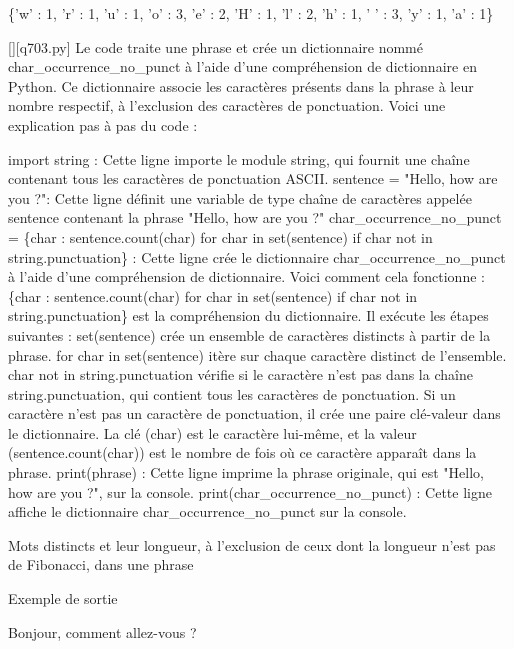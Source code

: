 \{'w' : 1, 'r' : 1, 'u' : 1, 'o' : 3, 'e' : 2, 'H' : 1, 'l' : 2, 'h' : 1, ' ' : 3, 'y' : 1, 'a' : 1\}
        \par
        \begin{solution}
            \renewcommand{\nomfichier}{q703.py}
            \pythonfile{\chemincode \nomfichier}[][\nomfichier]
            Le code traite une phrase et crée un dictionnaire nommé char\_occurrence\_no\_punct à l'aide d'une compréhension de dictionnaire en Python. Ce dictionnaire associe les caractères présents dans la phrase à leur nombre respectif, à l'exclusion des caractères de ponctuation. Voici une explication pas à pas du code :

    import string : Cette ligne importe le module string, qui fournit une chaîne contenant tous les caractères de ponctuation ASCII.
    sentence = "Hello, how are you ?": Cette ligne définit une variable de type chaîne de caractères appelée sentence contenant la phrase "Hello, how are you ?"
    char\_occurrence\_no\_punct = \{char : sentence.count(char) for char in set(sentence) if char not in string.punctuation\} : Cette ligne crée le dictionnaire char\_occurrence\_no\_punct à l'aide d'une compréhension de dictionnaire. Voici comment cela fonctionne :
        \{char : sentence.count(char) for char in set(sentence) if char not in string.punctuation\} est la compréhension du dictionnaire. Il exécute les étapes suivantes :
        set(sentence) crée un ensemble de caractères distincts à partir de la phrase.
        for char in set(sentence) itère sur chaque caractère distinct de l'ensemble.
        char not in string.punctuation vérifie si le caractère n'est pas dans la chaîne string.punctuation, qui contient tous les caractères de ponctuation.
        Si un caractère n'est pas un caractère de ponctuation, il crée une paire clé-valeur dans le dictionnaire. La clé (char) est le caractère lui-même, et la valeur (sentence.count(char)) est le nombre de fois où ce caractère apparaît dans la phrase.
    print(phrase) : Cette ligne imprime la phrase originale, qui est "Hello, how are you ?", sur la console.
    print(char\_occurrence\_no\_punct) : Cette ligne affiche le dictionnaire char\_occurrence\_no\_punct sur la console.
        \end{solution}
        

        \question
        Mots distincts et leur longueur, à l'exclusion de ceux dont la longueur n'est pas de Fibonacci, dans une phrase

Exemple de sortie

Bonjour, comment allez-vous ?

